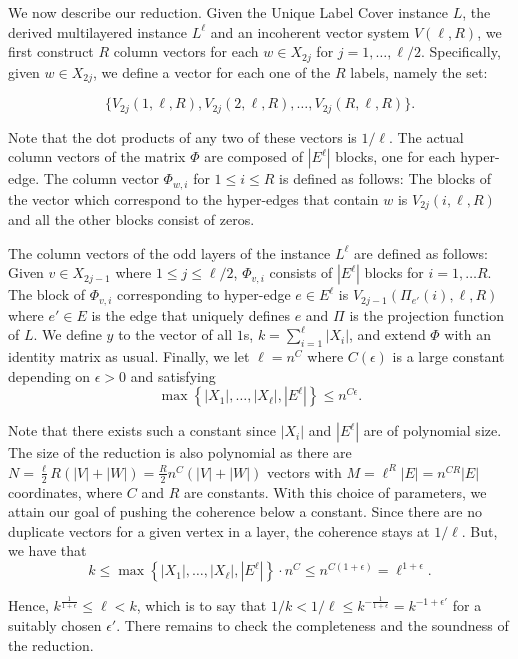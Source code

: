 \documentclass[11pt]{article}
\begin{document}
We now describe our reduction. Given the Unique
Label Cover instance $L$, the derived multilayered instance
$L^{\ell}$ and an incoherent vector system $V(\ell,R)$,
we first construct $R$ column
vectors for each $w \in X_{2j}$ for $j=1,\hdots,\ell/2$.
Specifically, given $w \in X_{2j}$, we define a vector for
each one of the $R$ labels, namely the set:

$$\{V_{2j}(1,\ell,R), V_{2j}(2,\ell,R), \hdots, V_{2j}(R,\ell,R)\}.$$

\noindent Note that the dot products of any two of these vectors is
$1/\ell$. The actual column vectors of the matrix $\Phi$ are
composed of $|E^{\ell}|$ blocks, one for each hyper-edge. The
column vector $\Phi_{w,i}$ for $1 \leq i \leq R$ is defined as follows:
The blocks of the vector which correspond to the hyper-edges
that contain $w$ is $V_{2j}(i,\ell,R)$ and all the other
blocks consist of zeros.

The column vectors of the odd layers of the instance
$L^{\ell}$ are defined as follows: Given $v \in X_{2j-1}$ where
$1 \leq j \leq \ell/2$, $\Phi_{v,i}$ consists of $|E^{\ell}|$ blocks
for $i=1, \hdots R$. The block of $\Phi_{v,i}$
corresponding to hyper-edge $e \in E^{\ell}$ is $V_{2j-1}(\Pi_{e'}(i),
\ell, R)$ where $e' \in E$ is the edge that uniquely defines
$e$ and $\Pi$ is the projection function of $L$. We
define $y$ to the vector of all $1$s, $k=\sum_{i=1}^{\ell} |X_i|$, and
extend $\Phi$ with an identity matrix as usual. Finally, we let
$\ell = n^C$ where $C(\epsilon)$ is a large constant depending on
$\epsilon>0$ and satisfying
$$
\max \left\{ |X_1|, \hdots, |X_{\ell}|, |E^{\ell}|\right\} \leq n^{C \epsilon}.
$$

\noindent Note that there exists such a constant since
$|X_i|$ and $|E^{\ell}|$ are of polynomial size. The size of the
reduction is also polynomial as
there are $N = \frac{\ell}{2}R(|V|+|W|)=\frac{R}{2}n^C(|V|+|W|)$ vectors with
$M = \ell^R |E|=n^{CR}|E|$
coordinates, where $C$ and $R$ are constants. With this choice of parameters,
we attain our goal of pushing the coherence below a constant.
Since there are no duplicate vectors for a given vertex in a
layer, the coherence stays at $1/\ell$. But, we have that
$$
k \leq {\max \left\{|X_1|, \hdots, |X_{\ell}|, |E^{\ell}|\right\}} \cdot n^C
\leq n^{C(1+\epsilon)} = \ell^{1+\epsilon}.
$$

\noindent Hence, $k^{\frac{1}{1+\epsilon}} \leq \ell < k$, which is to say that
$1/k < 1/\ell \leq k^{-\frac{1}{1+\epsilon}} = k^{-1+\epsilon'}$ for a suitably
chosen $\epsilon'$. There remains to check the completeness and the soundness
of the reduction.
\end{document}
